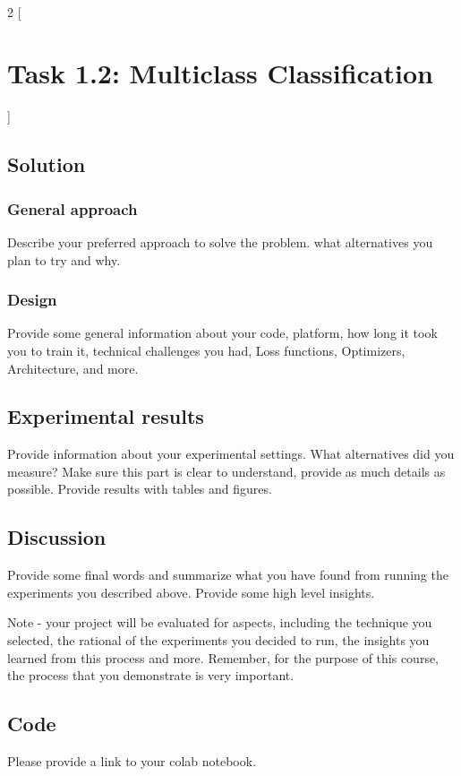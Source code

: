 \documentclass{article}
\begin{document}
\
\begin{multicols}{2}
[
\section{\centering Task 1.2: Multiclass Classification}
]
\subsection{Solution}
\subsubsection{General approach}
Describe your preferred approach to solve the problem. what alternatives you plan to try and why. 

\subsubsection{Design}
Provide some general information about your code, platform, how long it took you to train it, technical challenges you had, Loss functions, Optimizers, Architecture, and more.

\subsection{Experimental results}
Provide information about your experimental settings. What alternatives did you measure? Make sure this part is clear to understand, provide as much details as possible. Provide results with tables and figures.

\subsection{Discussion}
Provide some final words and summarize what you have found from running the experiments you described above. Provide some high level insights.

Note - your project will be evaluated for aspects, including the technique you selected, the rational of the experiments you decided to run, the insights you learned from this process and more. Remember, for the purpose of this course, the process that you demonstrate is very  important.

\subsection{Code}

Please provide a link to your colab notebook.

\end{multicols}
\end{document}
